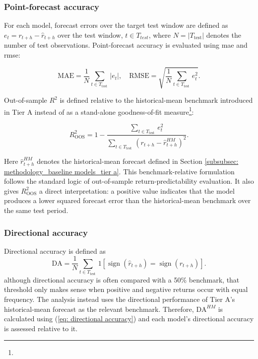 \subsubsection{Point-forecast accuracy}
For each model, forecast errors over the target test window are defined as $e_t=r_{t+h}-\hat r_{t+h}$ over the test window, $t\in T_{test}$, where $N=\left|T_\text{test}\right|$ denotes the number of test observations. Point-forecast accuracy is evaluated using \ac{mae} and \ac{rmse}:

\begin{equation}
\mathrm{MAE}=\frac{1}{N} \sum_{t \in T_{\text {test }}}\left|e_t\right|, \quad \mathrm{RMSE}=\sqrt{\frac{1}{N} \sum_{t \in T_{\text {test }}} e_t^2} .
\end{equation}

\noindent Out-of-sample $R^2$ is defined relative to the historical-mean benchmark introduced in Tier A instead of as a stand-alone goodness-of-fit measure\footnote{}:

\begin{equation}
R_\text{OOS}^2=1-\frac{\sum_{t \in T_{\text {test }}}e_t^2}{\sum_{t \in T_{\text {test }}}\left(r_{t+h}-\hat{r}_{t+h}^{H M}\right)^2}.
\end{equation}

\noindent Here $\hat{r}_{t+h}^{HM}$ denotes the historical-mean forecast defined in Section \ref{subsubsec: methodology_baseline models_tier a}. This benchmark-relative formulation follows the standard logic of out-of-sample return-predictability evaluation. It also gives $R^2_\text{OOS}$ a direct interpretation: a positive value indicates that the model produces a lower squared forecast error than the historical-mean benchmark over the same test period.

\subsubsection{Directional accuracy}
Directional accuracy is defined as
\begin{equation}
\mathrm{DA}=\frac{1}{N} \sum_{t \in T_{\text {test }}} 1\left[\operatorname{sign}\left(\hat{r}_{t+h}\right)=\operatorname{sign}\left(r_{t+h}\right)\right] .
\label{eq: directional accuracy}
\end{equation}
\noindent although directional accuracy is often compared with a 50\% benchmark, that threshold only makes sense when positive and negative returns occur with equal frequency. The analysis instead uses the directional performance of Tier A's historical-mean forecast as the relevant benchmark. Therefore, $\mathrm{DA}^{HM}$ is calculated using (\ref{eq: directional accuracy}) and each model's directional accuracy is assessed relative to it.

